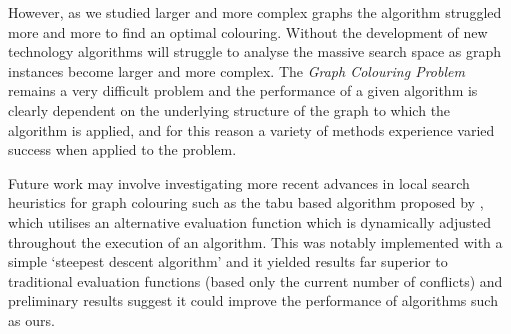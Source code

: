 \documentclass[12pt,a4paper]{article}
\begin{document}
\par However, as we studied larger and more complex graphs the algorithm struggled more and more to find an optimal colouring. Without the development of new technology algorithms will struggle to analyse the massive search space as graph instances become larger and more complex. The \textit{Graph Colouring Problem} remains a very difficult problem and the performance of a given algorithm is clearly dependent on the underlying structure of the graph to which the algorithm is applied, and for this reason a variety of methods experience varied success when applied to the problem. 
\par Future work may involve investigating more recent advances in local search heuristics for graph colouring such as the tabu based algorithm proposed by \cite{Porumbel}, which utilises an alternative evaluation function which is dynamically adjusted throughout the execution of an algorithm. This was notably implemented with a simple `steepest descent algorithm' and it yielded results far superior to traditional evaluation functions (based only the current number of conflicts) and preliminary results suggest it could improve the performance of algorithms such as ours.

{\footnotesize }
\end{document}
